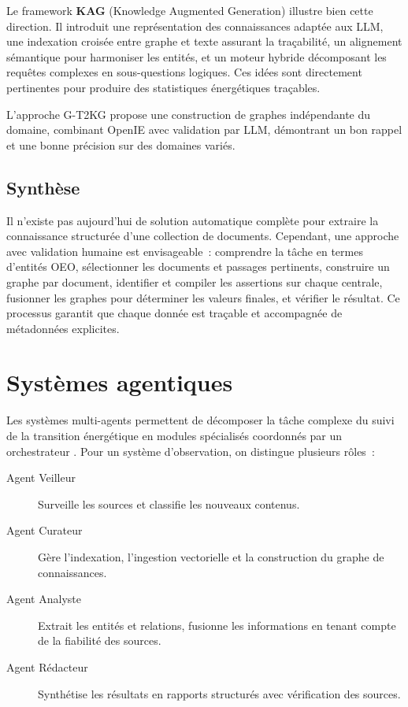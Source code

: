 \documentclass[a4paper,11pt]{report}
\begin{document}
Le framework \textbf{KAG} (Knowledge Augmented Generation) \citep{74SRYH2Q} illustre bien cette direction. Il introduit une représentation des connaissances adaptée aux LLM, une indexation croisée entre graphe et texte assurant la traçabilité, un alignement sémantique pour harmoniser les entités, et un moteur hybride décomposant les requêtes complexes en sous-questions logiques. Ces idées sont directement pertinentes pour produire des statistiques énergétiques traçables.

L'approche G-T2KG \citep{A8YXRKGQ} propose une construction de graphes indépendante du domaine, combinant OpenIE avec validation par LLM, démontrant un bon rappel et une bonne précision sur des domaines variés.

\section{Synthèse}

Il n'existe pas aujourd'hui de solution automatique complète pour extraire la connaissance structurée d'une collection de documents. Cependant, une approche avec validation humaine est envisageable~: comprendre la tâche en termes d'entités OEO, sélectionner les documents et passages pertinents, construire un graphe par document, identifier et compiler les assertions sur chaque centrale, fusionner les graphes pour déterminer les valeurs finales, et vérifier le résultat. Ce processus garantit que chaque donnée est traçable et accompagnée de métadonnées explicites.

\chapter{Systèmes agentiques}\label{chap:agents}

Les systèmes multi-agents permettent de décomposer la tâche complexe du suivi de la transition énergétique en modules spécialisés coordonnés par un orchestrateur \citep{W45HUZN5,MW2ME5P3}. Pour un système d'observation, on distingue plusieurs rôles~:

\begin{description}
\item[Agent Veilleur] Surveille les sources et classifie les nouveaux contenus.
\item[Agent Curateur] Gère l'indexation, l'ingestion vectorielle et la construction du graphe de connaissances.
\item[Agent Analyste] Extrait les entités et relations, fusionne les informations en tenant compte de la fiabilité des sources.
\item[Agent Rédacteur] Synthétise les résultats en rapports structurés avec vérification des sources.
\end{description}
\end{document}
